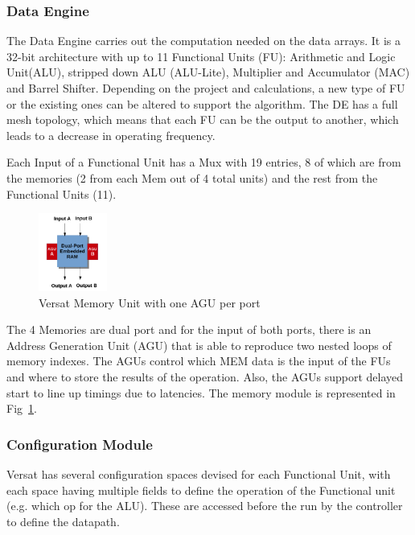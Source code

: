 \documentclass[conference]{IEEEtran}
\begin{document}
\subsubsection{Data Engine}


The Data Engine carries out the computation needed on the data arrays. It is a 32-bit architecture with up to 11 Functional Units (FU):
 Arithmetic and Logic Unit(ALU), stripped down ALU (ALU-Lite),
 Multiplier and Accumulator (MAC) and Barrel Shifter.
 Depending on the project and calculations, a new type of FU or the existing ones can be altered to support the algorithm.
 The DE has a full mesh topology, which means that each FU can be the output to another, which leads to a decrease in operating frequency.

 Each Input of a Functional Unit has a Mux with 19 entries, 8 of which are from the memories (2 from each Mem out of 4 total units) and the rest from the Functional Units (11).

 \begin{figure}[!htbp]
    \centering
    \includegraphics[width=0.2\textwidth]{Figures/fu2.pdf}
    \caption{Versat Memory Unit with one AGU per port~\cite{lopes:Versat}}
    \label{figure:FU}
\end{figure} 


 The 4 Memories are dual port and for the input of both ports, 
 there is an Address Generation Unit (AGU) that is able to 
 reproduce two nested loops of memory indexes.
 The AGUs control which MEM data is the input of the FUs and where
 to store the results of the operation. Also, the AGUs support delayed start to line up timings
due to latencies. The memory module is represented in Fig~\ref{figure:FU}.

\subsubsection{Configuration Module}
Versat has several configuration spaces devised for each Functional Unit,
with each space having multiple fields to define the operation of the Functional unit (e.g. which op for the ALU).
These are accessed before the run by the controller to define the datapath.
\end{document}
